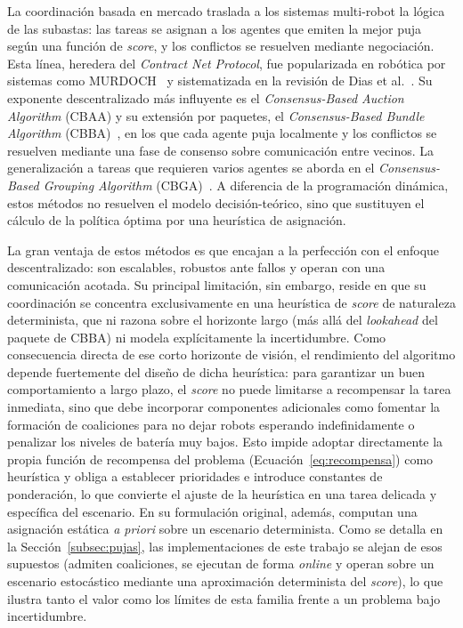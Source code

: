 La coordinación basada en mercado traslada a los sistemas multi-robot la lógica de las subastas: las tareas se asignan a los agentes que emiten la mejor puja según una función de \emph{score}, y los conflictos se resuelven mediante negociación. Esta línea, heredera del \textit{Contract Net Protocol}, fue popularizada en robótica por sistemas como MURDOCH~\cite{gerkey2002sold} y sistematizada en la revisión de Dias et al.~\cite{dias2006market}. Su exponente descentralizado más influyente es el \emph{Consensus-Based Auction Algorithm} (CBAA) y su extensión por paquetes, el \emph{Consensus-Based Bundle Algorithm} (CBBA)~\cite{choi2009consensus}, en los que cada agente puja localmente y los conflictos se resuelven mediante una fase de consenso sobre comunicación entre vecinos. La generalización a tareas que requieren varios agentes se aborda en el \emph{Consensus-Based Grouping Algorithm} (CBGA)~\cite{hunt2014cbga}. A diferencia de la programación dinámica, estos métodos no resuelven el modelo decisión-teórico, sino que sustituyen el cálculo de la política óptima por una heurística de asignación.
 
La gran ventaja de estos métodos es que encajan a la perfección con el enfoque descentralizado: son escalables, robustos ante fallos y operan con una comunicación acotada. Su principal limitación, sin embargo, reside en que su coordinación se concentra exclusivamente en una heurística de \textit{score} de naturaleza determinista, que ni razona sobre el horizonte largo (más allá del \textit{lookahead} del paquete de CBBA) ni modela explícitamente la incertidumbre. Como consecuencia directa de ese corto horizonte de visión, el rendimiento del algoritmo depende fuertemente del diseño de dicha heurística: para garantizar un buen comportamiento a largo plazo, el \textit{score} no puede limitarse a recompensar la tarea inmediata, sino que debe incorporar componentes adicionales como fomentar la formación de coaliciones para no dejar robots esperando indefinidamente o penalizar los niveles de batería muy bajos. Esto impide adoptar directamente la propia función de recompensa del problema (Ecuación~\eqref{eq:recompensa}) como heurística y obliga a establecer prioridades e introduce constantes de ponderación, lo que convierte el ajuste de la heurística en una tarea delicada y específica del escenario. En su formulación original, además, computan una asignación estática \emph{a priori} sobre un escenario determinista. Como se detalla en la Sección~\ref{subsec:pujas}, las implementaciones de este trabajo se alejan de esos supuestos (admiten coaliciones, se ejecutan de forma \textit{online} y operan sobre un escenario estocástico mediante una aproximación determinista del \textit{score}), lo que ilustra tanto el valor como los límites de esta familia frente a un problema bajo incertidumbre.
 
